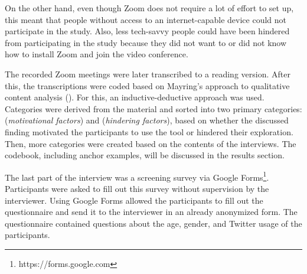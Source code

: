 On the other hand, even though Zoom does not require a lot of effort to set up, this meant that people without access to an internet-capable device could not participate in the study. Also, less tech-savvy people could have been hindered from participating in the study because they did not want to or did not know how to install Zoom and join the video conference.

The recorded Zoom meetings were later transcribed to a reading version. After this, the transcriptions were coded based on Mayring's approach to qualitative content analysis (\cite{mayring2010qualitative}). For this, an inductive-deductive approach was used. Categories were derived from the material and sorted into two primary categories:  (\emph{motivational factors}) and  (\emph{hindering factors}), based on whether the discussed finding motivated the participants to use the tool or hindered their exploration. Then, more categories were created based on the contents of the interviews. The codebook, including anchor examples, will be discussed in the results section.

The last part of the interview was a screening survey via Google Forms\footnote{https://forms.google.com}. Participants were asked to fill out this survey without supervision by the interviewer. Using Google Forms allowed the participants to fill out the questionnaire and send it to the interviewer in an already anonymized form. The questionnaire contained questions about the age, gender, and Twitter usage of the participants.
